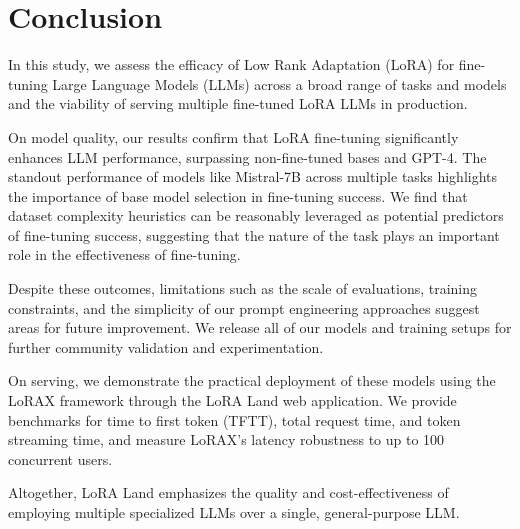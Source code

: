 \section{Conclusion}
In this study, we assess the efficacy of Low Rank Adaptation (LoRA) for fine-tuning Large Language Models (LLMs) across a broad range of tasks and models and the viability of serving multiple fine-tuned LoRA LLMs in production.

On model quality, our results confirm that LoRA fine-tuning significantly enhances LLM performance, surpassing non-fine-tuned bases and GPT-4. The standout performance of models like Mistral-7B across multiple tasks highlights the importance of base model selection in fine-tuning success. We find that dataset complexity heuristics can be reasonably leveraged as potential predictors of fine-tuning success, suggesting that the nature of the task plays an important role in the effectiveness of fine-tuning.

Despite these outcomes, limitations such as the scale of evaluations, training constraints, and the simplicity of our prompt engineering approaches suggest areas for future improvement. We release all of our models and training setups for further community validation and experimentation.

On serving, we demonstrate the practical deployment of these models using the LoRAX framework through the LoRA Land web application. We provide benchmarks for time to first token (TFTT), total request time, and token streaming time, and measure LoRAX's latency robustness to up to 100 concurrent users. 

Altogether, LoRA Land emphasizes the quality and cost-effectiveness of employing multiple specialized LLMs over a single, general-purpose LLM.
